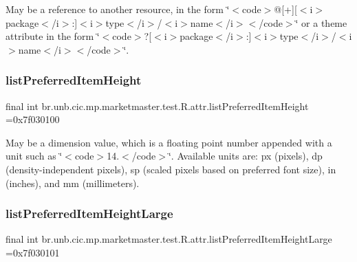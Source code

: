 May be a reference to another resource, in the form \char`\"{}$<$code$>$@\mbox{[}+\mbox{]}\mbox{[}$<$i$>$package$<$/i$>$\+:\mbox{]}$<$i$>$type$<$/i$>$/$<$i$>$name$<$/i$>$$<$/code$>$\char`\"{} or a theme attribute in the form \char`\"{}$<$code$>$?\mbox{[}$<$i$>$package$<$/i$>$\+:\mbox{]}$<$i$>$type$<$/i$>$/$<$i$>$name$<$/i$>$$<$/code$>$\char`\"{}. \mbox{\label{classbr_1_1unb_1_1cic_1_1mp_1_1marketmaster_1_1test_1_1R_1_1attr_ac5eb19ce9adc6ade927aeb5d4359ac49}} 
\subsubsection{\texorpdfstring{list\+Preferred\+Item\+Height}{listPreferredItemHeight}}
{\footnotesize\ttfamily final int br.\+unb.\+cic.\+mp.\+marketmaster.\+test.\+R.\+attr.\+list\+Preferred\+Item\+Height =0x7f030100\hspace{0.3cm}{\ttfamily [static]}}

May be a dimension value, which is a floating point number appended with a unit such as \char`\"{}$<$code$>$14.\+5sp$<$/code$>$\char`\"{}. Available units are\+: px (pixels), dp (density-\/independent pixels), sp (scaled pixels based on preferred font size), in (inches), and mm (millimeters). \mbox{\label{classbr_1_1unb_1_1cic_1_1mp_1_1marketmaster_1_1test_1_1R_1_1attr_a8cd517de97bcad120fef75b3a41b38b6}} 
\subsubsection{\texorpdfstring{list\+Preferred\+Item\+Height\+Large}{listPreferredItemHeightLarge}}
{\footnotesize\ttfamily final int br.\+unb.\+cic.\+mp.\+marketmaster.\+test.\+R.\+attr.\+list\+Preferred\+Item\+Height\+Large =0x7f030101\hspace{0.3cm}{\ttfamily [static]}}


